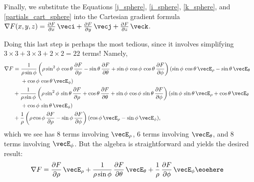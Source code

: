 {Finally, we substitute the Equations \eqref{j_sphere}, \eqref{i_sphere}, \eqref{k_sphere}, and \eqref{partials_cart_sphere} into the Cartesian gradient formula $\nabla F(x,y,z) = \frac{\partial F}{\partial x}\,\veci + \frac{\partial F}{\partial y}\,\vecj + \frac{\partial F}{\partial z}\,\veck$.

Doing this last step is perhaps the most tedious, since it involves simplifying $3 \times 3 + 3 \times 3 + 2 \times 2 = 22$ terms! Namely,
\begin{align*}
 \nabla F &= \frac{1}{\rho\sin\phi}\left( \rho\sin^2\phi\,\cos\theta\,
  \frac{\partial F}{\partial \rho} - \sin\theta\,\frac{\partial F}{\partial \theta} + \sin\phi\,\cos\phi\,\cos\theta\,
  \frac{\partial F}{\partial \phi} \right) (\sin\phi\,\cos\theta\,\vecE_{\rho} - \sin\theta\,\vecE_{\theta}\\
  &\mathrel{\phantom{=}} {} + \cos\phi\,\cos\theta\,\vecE_{\phi})\\
  &+ \frac{1}{\rho\sin\phi}\left( \rho\sin^2\phi\,\sin\theta\,
  \frac{\partial F}{\partial \rho} + \cos\theta\,\frac{\partial F}{\partial \theta} + \sin\phi\,\cos\phi\,\sin\theta\,
  \frac{\partial F}{\partial \phi} \right) (\sin\phi\,\sin\theta\,\vecE_{\rho} + \cos\theta\,\vecE_{\theta}\\
  &\mathrel{\phantom{=}} {} + \cos\phi\,\sin\theta\,\vecE_{\phi})\\
  &+ \frac{1}{\rho}\left( \rho\cos\phi\,\frac{\partial F}{\partial \rho} -
  \sin\phi\,\frac{\partial F}{\partial \phi} \right) (\cos\phi\,\vecE_{\rho} - \sin\phi\,\vecE_{\phi}) ,
\end{align*}
which we see has $8$ terms involving $\vecE_{\rho}$, $6$ terms involving $\vecE_{\theta}$, and $8$ terms involving $\vecE_{\phi}$. But the algebra is straightforward and yields the desired result:
\[
 \nabla F = \frac{\partial F}{\partial \rho}\,\vecE_{\rho} +
  \frac{1}{\rho \sin \phi}\,\frac{\partial F}{\partial \theta}\,\vecE_{\theta} +
  \frac{1}{\rho}\,\frac{\partial F}{\partial \phi}\,\vecE_{\phi}\eoehere
\]}

